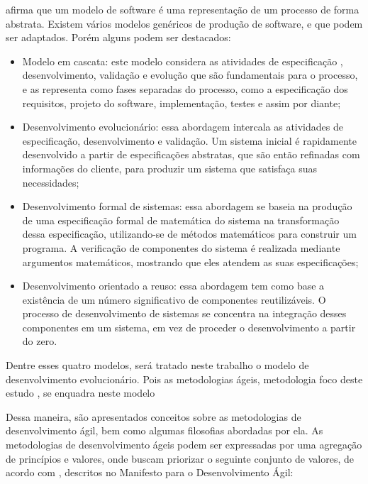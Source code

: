 \cite{sommerville2011software} afirma que um modelo de software é uma representação de um processo de forma abstrata. Existem vários modelos genéricos de produção de software, e que podem ser adaptados. Porém alguns podem ser destacados:

\begin{itemize}
    \item Modelo em cascata: este modelo considera as atividades de especificação
        , desenvolvimento, validação e evolução que são fundamentais para 
        o processo, e as representa como fases separadas do processo, como 
        a especificação dos requisitos, projeto do software, implementação, testes e assim por diante;

    \item Desenvolvimento evolucionário: essa abordagem intercala as atividades 
        de especificação, desenvolvimento e validação. Um sistema inicial 
        é rapidamente desenvolvido a partir de especificações abstratas, 
        que são então refinadas com informações do cliente, para produzir 
        um sistema que satisfaça suas necessidades;


    \item Desenvolvimento formal de sistemas: essa abordagem se baseia 
        na produção de uma especificação formal de matemática do sistema 
        na transformação dessa especificação, utilizando-se de métodos 
        matemáticos para construir um programa. A verificação de componentes 
        do sistema é realizada mediante argumentos matemáticos, mostrando 
        que eles atendem as suas especificações;

    \item Desenvolvimento orientado a reuso: essa abordagem tem como base 
        a existência de um número significativo de componentes reutilizáveis.
        O processo de desenvolvimento de sistemas se concentra na integração 
        desses componentes em um sistema, em vez de proceder o desenvolvimento 
        a partir do zero.

\end{itemize}

Dentre esses quatro modelos, será tratado neste trabalho o modelo de desenvolvimento 
evolucionário. Pois as metodologias ágeis, metodologia foco deste estudo
, se enquadra neste modelo


Dessa maneira, são apresentados conceitos sobre as metodologias de desenvolvimento ágil, bem como algumas filosofias abordadas por ela.
As metodologias de desenvolvimento ágeis podem ser expressadas por uma agregação de princípios e valores, onde buscam priorizar o seguinte conjunto de valores, de acordo com \cite{beck2001agile}, descritos no Manifesto para o Desenvolvimento Ágil:


